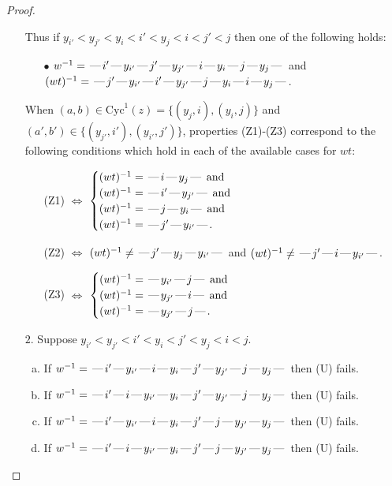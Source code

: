 \documentclass[10pt]{article}
\theoremstyle{definition}
\theoremstyle{definition}
\def\dash{\text{\hspace{0.5mm}---\hspace{0.5mm}}}
\def\Cyc{\mathrm{Cyc}}
\begin{document}
\begin{proof}
\begin{enumerate}
\begin{enumerate}[(a)]
\end{enumerate}
Thus if $y_{i'} < y_{j'} < y_i < i' < y_j < i < j' < j$ then one of the following holds:
\begin{enumerate}
\item[$\bullet$] $w^{-1} = \dash i'\dash y_{i'}\dash j'\dash y_{j'}\dash i\dash y_i\dash j\dash y_j\dash $ and $(wt)^{-1} = \dash j'\dash y_{i'}\dash i'\dash y_{j'}\dash j\dash y_i\dash i\dash y_j\dash $.
\end{enumerate}
When $(a,b)\in\Cyc^1(z)=\{(y_j,i),(y_i,j)\}$ and $(a',b')\in\{(y_{j'},i'),(y_{i'},j')\}$,
properties (Z1)-(Z3) correspond to the following conditions which
hold in each of the available cases for $wt$:
\begin{enumerate}
\item[](Z1) $\Leftrightarrow$ $\begin{cases}\text{$(wt)^{-1} = \dash i \dash y_j \dash$}\text{ and }\\
\text{$(wt)^{-1} = \dash i' \dash y_{j'} \dash$}\text{ and }\\
\text{$(wt)^{-1} = \dash j \dash y_i \dash$}\text{ and }\\
\text{$(wt)^{-1} = \dash j' \dash y_{i'} \dash$}.\end{cases}$
\item[](Z2) $\Leftrightarrow$ $(wt)^{-1} \neq \dash j' \dash y_j \dash y_{i'} \dash$ and $(wt)^{-1}\neq \dash j' \dash i \dash y_{i'} \dash$.
\item[](Z3) $\Leftrightarrow$ $\begin{cases}\text{$(wt)^{-1} = \dash y_{i'} \dash j \dash$}\text{ and }\\
\text{$(wt)^{-1} = \dash y_{j'} \dash i \dash$}\text{ and }\\
\text{$(wt)^{-1} = \dash y_{j'} \dash j \dash$}.\end{cases}$
\end{enumerate}
\item[$2$.] Suppose $y_{i'} < y_{j'} < i' < y_i < j' < y_j < i < j$.
\begin{enumerate}[(a)]
\item If $w^{-1} = \dash i'\dash y_{i'}\dash i\dash y_i\dash j'\dash y_{j'}\dash j\dash y_j\dash $ then (U) fails.
\item If $w^{-1} = \dash i'\dash i\dash y_{i'}\dash y_i\dash j'\dash y_{j'}\dash j\dash y_j\dash $ then (U) fails.
\item If $w^{-1} = \dash i'\dash y_{i'}\dash i\dash y_i\dash j'\dash j\dash y_{j'}\dash y_j\dash $ then (U) fails.
\item If $w^{-1} = \dash i'\dash i\dash y_{i'}\dash y_i\dash j'\dash j\dash y_{j'}\dash y_j\dash $ then (U) fails.

\end{enumerate}
\end{enumerate}
\end{proof}
\end{document}
